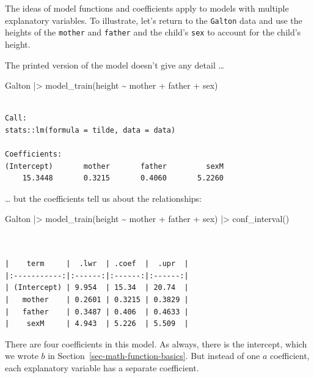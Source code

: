 \documentclass[
  letterpaper,
  DIV=11,
  numbers=noendperiod,
  oneside]{scrartcl}
\newenvironment{Shaded}{\begin{snugshade}}{\end{snugshade}}
\newcommand{\FunctionTok}[1]{\textcolor[rgb]{0.28,0.35,0.67}{#1}}
\newcommand{\NormalTok}[1]{\textcolor[rgb]{0.00,0.23,0.31}{#1}}
\newcommand{\SpecialCharTok}[1]{\textcolor[rgb]{0.37,0.37,0.37}{#1}}
\begin{document}
The ideas of model functions and coefficients apply to models with
multiple explanatory variables. To illustrate, let's return to the
\texttt{Galton} data and use the heights of the \texttt{mother} and
\texttt{father} and the child's \texttt{sex} to account for the child's
height.

The printed version of the model doesn't give any detail \ldots{}

\begin{Shaded}
\begin{Highlighting}[]
\NormalTok{Galton }\SpecialCharTok{|\textgreater{}} 
  \FunctionTok{model\_train}\NormalTok{(height }\SpecialCharTok{\textasciitilde{}}\NormalTok{ mother }\SpecialCharTok{+}\NormalTok{ father }\SpecialCharTok{+}\NormalTok{ sex)}
\end{Highlighting}
\end{Shaded}

\begin{verbatim}

Call:
stats::lm(formula = tilde, data = data)

Coefficients:
(Intercept)       mother       father         sexM  
    15.3448       0.3215       0.4060       5.2260  
\end{verbatim}

\ldots{} but the coefficients tell us about the relationships:

\begin{Shaded}
\begin{Highlighting}[]
\NormalTok{Galton }\SpecialCharTok{|\textgreater{}} 
  \FunctionTok{model\_train}\NormalTok{(height }\SpecialCharTok{\textasciitilde{}}\NormalTok{ mother }\SpecialCharTok{+}\NormalTok{ father }\SpecialCharTok{+}\NormalTok{ sex) }\SpecialCharTok{|\textgreater{}}
  \FunctionTok{conf\_interval}\NormalTok{()}
\end{Highlighting}
\end{Shaded}

\begin{verbatim}


|    term     |  .lwr  | .coef  |  .upr  |
|:-----------:|:------:|:------:|:------:|
| (Intercept) | 9.954  | 15.34  | 20.74  |
|   mother    | 0.2601 | 0.3215 | 0.3829 |
|   father    | 0.3487 | 0.406  | 0.4633 |
|    sexM     | 4.943  | 5.226  | 5.509  |
\end{verbatim}

There are four coefficients in this model. As always, there is the
intercept, which we wrote \(b\) in
Section~\ref{sec-math-function-basics}. But instead of one \(a\)
coefficient, each explanatory variable has a separate coefficient.
\end{document}
